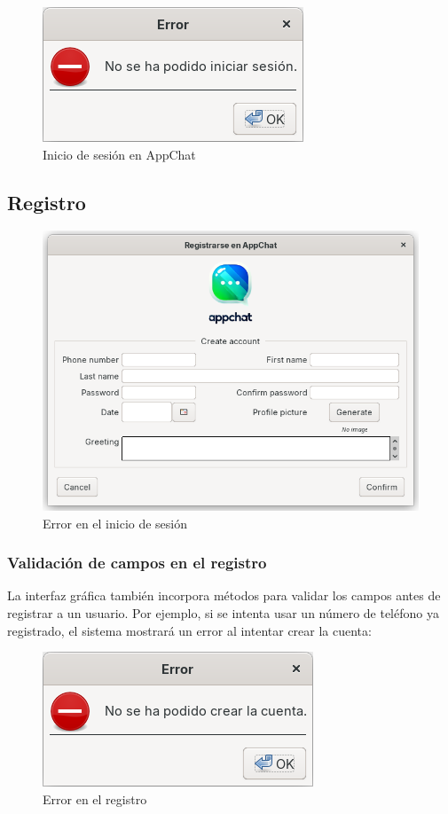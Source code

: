 \documentclass[11pt]{article}
\begin{document}
\begin{figure}[H]
	\centering
	\includegraphics[width=0.4\linewidth]{error-login.png}
	\caption{Inicio de sesión en AppChat}
	\label{fig:error-login}
\end{figure}

\subsection{Registro}

\begin{figure}[H]
	\centering
	\includegraphics[width=0.6\linewidth]{register}
	\caption{Error en el inicio de sesión}
	\label{fig:register}
\end{figure}

\subsubsection{Validación de campos en el registro}

La interfaz gráfica también incorpora métodos para validar los campos antes de registrar a un usuario. Por ejemplo, si se intenta usar un número de teléfono ya registrado, el sistema mostrará un error al intentar crear la cuenta:

\begin{figure}[H]
	\centering
	\includegraphics[width=0.35\linewidth]{error-register}
	\caption{Error en el registro}
	\label{fig:error-register}
\end{figure}
\end{document}

